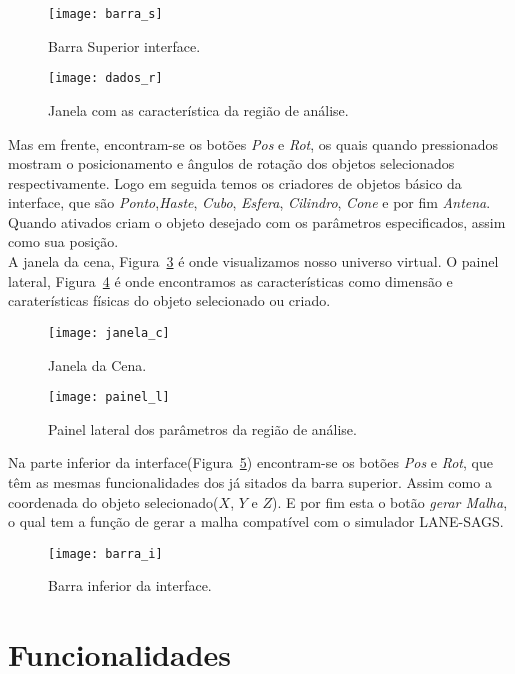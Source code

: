 \begin{figure}[ht!]
	\centering
	\texttt{[image: barra\_s]}
	\caption{Barra Superior interface.}
	\label{fg:barra_s}
\end{figure}
\begin{figure}[ht!]
	\centering
	\texttt{[image: dados\_r]}
	\caption{Janela com as característica da região de análise.}
	\label{fg:dados_r}
\end{figure}

Mas em frente, encontram-se os botões \textit{Pos} e \textit{Rot}, os quais quando pressionados mostram o posicionamento e ângulos de rotação dos objetos selecionados respectivamente. Logo em seguida temos os criadores de objetos básico da interface, que são \textit{Ponto},\textit{Haste}, \textit{Cubo}, \textit{Esfera}, \textit{Cilindro}, \textit{Cone} e por fim \textit{Antena}. Quando ativados criam o objeto desejado com os parâmetros especificados, assim como sua posição.\\

A janela da cena, Figura~\ref{fg:janela_c} é onde visualizamos nosso universo virtual. O painel lateral, Figura~\ref{fg:painel_l} é onde encontramos as características como dimensão e caraterísticas físicas do objeto selecionado ou criado.\\

\begin{figure}[ht!]
	\centering
	\texttt{[image: janela\_c]}
	\caption{Janela da Cena.}
	\label{fg:janela_c}
\end{figure}
\begin{figure}[ht!]
	\centering
	\texttt{[image: painel\_l]}
	\caption{Painel lateral dos parâmetros da região de análise.}
	\label{fg:painel_l}
\end{figure}

Na parte inferior da interface(Figura~\ref{fg:barra_i}) encontram-se os botões \textit{Pos} e \textit{Rot}, que têm as mesmas funcionalidades dos já sitados da barra superior. Assim como a coordenada do objeto selecionado($X$, $Y$ e $Z$). E por fim esta o botão \textit{gerar Malha}, o qual tem a função de gerar a malha compatível com o simulador LANE-SAGS.

\begin{figure}[ht!]
	\centering
	\texttt{[image: barra\_i]}
	\caption{Barra inferior da interface.}
	\label{fg:barra_i}
\end{figure}

\section{Funcionalidades}
